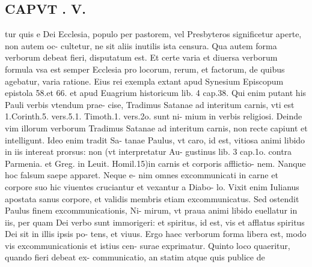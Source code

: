 \documentclass{article}
\begin{document}
\begin{pages}
\section*{CAPVT . V. }
\marginpar{[ p.397 ]}\pstart tur quis e Dei Ecclesia, populo per pastorem, vel Presbyteros significetur aperte, non autem oc- cultetur, ne sit aliis inutilis ista censura. Qua autem forma verborum debeat fieri, disputatum est. Et certe varia et diuersa verborum formula vsa est semper Ecclesia pro locorum, rerum, et factorum, de quibus agebatur, varia ratione. Eius rei exempla extant apud Synesium Episcopum epistola 58.et 66. et apud Euagrium historicum lib. 4 cap.38. Qui enim putant his Pauli verbis vtendum prae- cise, Tradimus Satanae ad interitum carnis, vti est 1.Corinth.5. vers.5.1. Timoth.1. vers.2o. sunt ni- mium in verbis religiosi. Deinde vim illorum verborum Tradimus Satanae ad interitum carnis, non recte capiunt et intelligunt. Ideo enim tradit Sa- tanae Paulus, vt caro, id est, vitiosa animi libido in iis intereat prorsus: non (vt interpretatur Au- gustinus lib. 3 cap.1o. contra Parmenia. et Greg. in Leuit. Homil.15)in carnis et corporis afflictio- nem. Nanque hoc falsum saepe apparet. Neque e- nim omnes excommunicati in carne et corpore suo hic viuentes cruciantur et vexantur a Diabo- lo. Vixit enim Iulianus apostata sanus corpore, et validis membris etiam excommunicatus. Sed ostendit Paulus finem excommunicationis, Ni- mirum, vt praua animi libido euellatur in iis, per quam Dei verbo sunt immorigeri: et spiritus, id est, vis et afflatus spiritus Dei sit in illis ipsis po- tens, et viuus. Ergo haec verborum forma libera est, modo vis excommunicationis et istius cen- surae exprimatur. Quinto loco quaeritur, quando fieri debeat ex- communicatio, an statim atque quis publice de  \pend

\end{pages}
\end{document}
